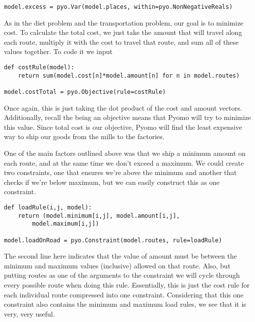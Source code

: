\documentclass{article}
\begin{document}
\begin{verbatim}
model.excess = pyo.Var(model.places, within=pyo.NonNegativeReals)
\end{verbatim}

As in the diet problem and the transportation problem, our goal is to minimize cost.  To calculate the total cost, we just take the amount that will travel along each route, multiply it with the cost to travel that route, and sum all of these values together.  To code it we input

\begin{verbatim}
def costRule(model):
    return sum(model.cost[n]*model.amount[n] for n in model.routes)

model.costTotal = pyo.Objective(rule=costRule)
\end{verbatim}

\noindent
Once again, this is just taking the dot product of the cost and amount vectors.  Additionally, recall the being an objective means that Pyomo will try to minimize this value.  Since total cost is our objective, Pyomo will find the least expensive way to ship our goods from the mills to the factories.

One of the main factors outlined above was that we ship a minimum amount on each route, and at the same time we don't exceed a maximum.  We could create two constraints, one that ensures we're above the minimum and another that checks if we're below maximum, but we can easily construct this as one constraint.

\begin{verbatim}
def loadRule(i,j, model):
    return (model.minimum[i,j], model.amount[i,j], 
        model.maximum[i,j])

model.loadOnRoad = pyo.Constraint(model.routes, rule=loadRule)
\end{verbatim}

The second line here indicates that the value of amount must be between the minimum and maximum values (inclusive) allowed on that route.  Also, but putting routes as one of the arguments to the constraint we will cycle through every possible route when doing this rule.  Essentially, this is just the cost rule for each individual route compressed into one constraint.  Considering that this one constraint also contains the minimum and maximum load rules, we see that it is very, very useful.
\end{document}
